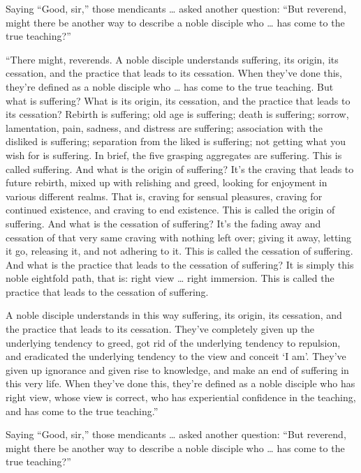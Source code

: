 \documentclass[12pt,openany]{book}%
\begin{document}
Saying “Good, sir,” those mendicants … asked another question: “But reverend, might there be another way to describe a noble disciple who … has come to the true teaching?” 

“There might, reverends. A noble disciple understands suffering, its origin, its cessation, and the practice that leads to its cessation. When they’ve done this, they’re defined as a noble disciple who … has come to the true teaching. But what is suffering? What is its origin, its cessation, and the practice that leads to its cessation? Rebirth is suffering; old age is suffering; death is suffering; sorrow, lamentation, pain, sadness, and distress are suffering; association with the disliked is suffering; separation from the liked is suffering; not getting what you wish for is suffering. In brief, the five grasping aggregates are suffering. This is called suffering. And what is the origin of suffering? It’s the craving that leads to future rebirth, mixed up with relishing and greed, looking for enjoyment in various different realms. That is, craving for sensual pleasures, craving for continued existence, and craving to end existence. This is called the origin of suffering. And what is the cessation of suffering? It’s the fading away and cessation of that very same craving with nothing left over; giving it away, letting it go, releasing it, and not adhering to it. This is called the cessation of suffering. And what is the practice that leads to the cessation of suffering? It is simply this noble eightfold path, that is: right view … right immersion. This is called the practice that leads to the cessation of suffering. 

A noble disciple understands in this way suffering, its origin, its cessation, and the practice that leads to its cessation. They’ve completely given up the underlying tendency to greed, got rid of the underlying tendency to repulsion, and eradicated the underlying tendency to the view and conceit ‘I am’. They’ve given up ignorance and given rise to knowledge, and make an end of suffering in this very life. When they’ve done this, they’re defined as a noble disciple who has right view, whose view is correct, who has experiential confidence in the teaching, and has come to the true teaching.” 

Saying “Good, sir,” those mendicants … asked another question: “But reverend, might there be another way to describe a noble disciple who … has come to the true teaching?” 
\end{document}
